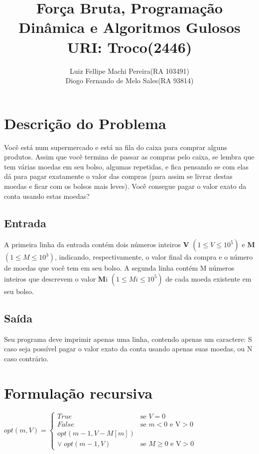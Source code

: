 \documentclass[12pt]{article}
\title{Força Bruta, Programação Dinâmica e Algoritmos Gulosos\\URI: Troco(2446)}
\author{Luiz Fellipe Machi Pereira(RA 103491)\\Diogo Fernando de Melo Sales(RA 93814)}
\begin{document}
 

\maketitle

\section{Descrição do Problema}

Você está num supermercado e está na fila do caixa para comprar alguns produtos. Assim que você termina de passar as compras pelo caixa, se lembra que tem várias moedas em seu bolso, algumas repetidas, e fica pensando se com elas dá para pagar exatamente o valor das compras (para assim se livrar destas moedas e ficar com os bolsos mais leves). Você consegue pagar o valor exato da conta usando estas moedas?
\subsection{Entrada}
A primeira linha da entrada contém dois números inteiros \textbf{V} $(1 \leq V \leq 10^{5})$ e \textbf{M} $(1 \leq M \leq 10^{3})$, indicando, respectivamente, o valor final da compra e o número de moedas que você tem em seu bolso. A segunda linha contém M números inteiros que descrevem o valor \textbf{M}{i} $(1 \leq M{i} \leq 10^{5})$ de cada moeda existente em seu bolso.
\subsection{Saída}
Seu programa deve imprimir apenas uma linha, contendo apenas um caractere: S caso seja possível pagar o valor exato da conta usando apenas suas moedas, ou N caso contrário.
\section{Formulação recursiva}
$opt(m,V) = \left \{ \begin{matrix} True & \mbox{se }V\mbox{$= 0$} \\ False & \mbox{se }m < 0\mbox{  e V} > 0 \\ opt(m-1,V - M[m])   
\\\vee \; opt(m-1,V) & \mbox{se }M \geq 0\mbox{  e V} > 0 \end{matrix} \right.$
\end{document}

